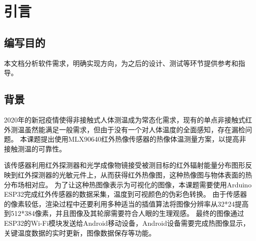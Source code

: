 
\chapter{引言}

\section{编写目的}
本文档分析软件需求，明确实现方向，为之后的设计、测试等环节提供参考和指导。


\section{背景}
2020年的新冠疫情使得非接触式人体测温成为常态化需求，现有的单点非接触式红外测温虽然能满足一般需求，但由于没有一个对人体温度的全面感知，存在漏检问题。
本课题提出使用MLX90640红外热像传感器的热像体温测量方案，以提高非接触测温的可靠性。

该传感器利用红外探测器和光学成像物镜接受被测目标的红外辐射能量分布图形反映到红外探测器的光敏元件上，从而获得红外热像图，这种热像图与物体表面的热分布场相对应。
为了让这种热图像表示为可视化的图像，本课题需要使用Arduino ESP32完成红外传感器的数据采集，温度到可视颜色的伪彩色转换。
由于传感器的像素较低，渲染过程中还要利用多种适当的插值算法将图像分辨率从32*24提高到512*384像素，并且图像及其轮廓需要符合人眼的生理观感。 
最终的图像通过ESP32的Wi-Fi模块发送给Android移动设备，Android设备需要完成热图像显示，关键温度数据的实时更新，图像数据保存等功能。
